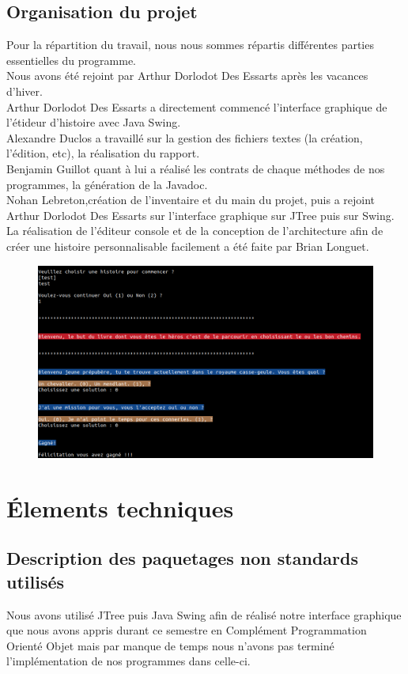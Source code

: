 \documentclass[12pt]{article}
\begin{document}
\subsection{Organisation du projet}
Pour la répartition du travail, nous nous sommes répartis différentes parties essentielles du programme.\\
Nous avons été rejoint par Arthur Dorlodot Des Essarts après les vacances d'hiver.\medskip
\\
\clearpage
Arthur Dorlodot Des Essarts a directement commencé l'interface graphique de l'étideur d'histoire avec Java Swing.\\
Alexandre Duclos a  travaillé sur la gestion des fichiers textes (la création, l'édition, etc), la réalisation du rapport.\\
Benjamin Guillot quant à lui a réalisé les contrats de chaque méthodes de nos programmes, la génération de la Javadoc.\\
Nohan Lebreton,création de l'inventaire et du main du projet, puis a rejoint Arthur Dorlodot Des Essarts sur l'interface graphique sur JTree puis sur Swing.\\
La réalisation de l'éditeur console et de la conception de l'architecture afin de créer une histoire personnalisable facilement a été faite par Brian Longuet.

\begin{figure}[h]
  \centering
    \includegraphics[width=1\textwidth]{Test}
\end{figure}
\clearpage
\section{\'Elements techniques}
\subsection{Description des paquetages non standards utilisés}
Nous avons utilisé JTree puis Java Swing afin de réalisé notre interface graphique que nous avons appris durant ce semestre en Complément Programmation Orienté Objet mais par manque de temps nous n'avons pas terminé l'implémentation de nos programmes dans celle-ci.
\end{document}

